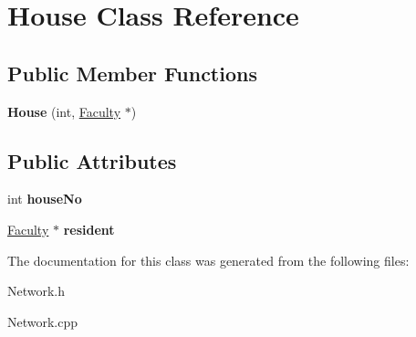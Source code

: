 \hypertarget{classHouse}{\section{\-House \-Class \-Reference}
\label{classHouse}
}
\subsection*{\-Public \-Member \-Functions}
\begin{DoxyCompactItemize}
\item 
\hypertarget{classHouse_a244fb27721bd4f4068cb260fc5273ac7}{{\bfseries \-House} (int, \hyperlink{classFaculty}{\-Faculty} $\ast$)}\label{classHouse_a244fb27721bd4f4068cb260fc5273ac7}

\end{DoxyCompactItemize}
\subsection*{\-Public \-Attributes}
\begin{DoxyCompactItemize}
\item 
\hypertarget{classHouse_a506aab7e4517175d27bf145c865b38a6}{int {\bfseries house\-No}}\label{classHouse_a506aab7e4517175d27bf145c865b38a6}

\item 
\hypertarget{classHouse_a100a955a1e9e444f47e1c2d9fa6b7225}{\hyperlink{classFaculty}{\-Faculty} $\ast$ {\bfseries resident}}\label{classHouse_a100a955a1e9e444f47e1c2d9fa6b7225}

\end{DoxyCompactItemize}


\-The documentation for this class was generated from the following files\-:\begin{DoxyCompactItemize}
\item 
\-Network.\-h\item 
\-Network.\-cpp\end{DoxyCompactItemize}
